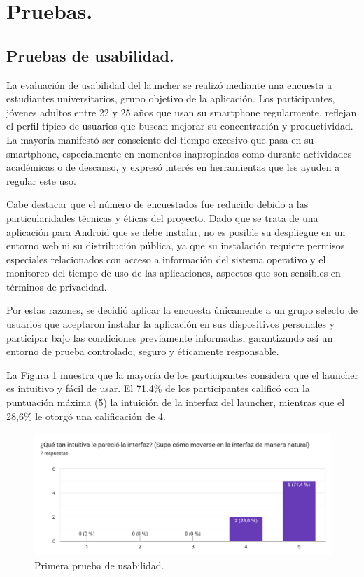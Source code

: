 \section{Pruebas.}
\label{sec:pruebas}

\subsection{Pruebas de usabilidad.}

La evaluación de usabilidad del launcher se realizó mediante una encuesta a estudiantes universitarios, grupo objetivo de la aplicación. Los participantes, jóvenes adultos entre 22 y 25 años que usan su smartphone regularmente, reflejan el perfil típico de usuarios que buscan mejorar su concentración y productividad. La mayoría manifestó ser consciente del tiempo excesivo que pasa en su smartphone, especialmente en momentos inapropiados como durante actividades académicas o de descanso, y expresó interés en herramientas que les ayuden a regular este uso.

Cabe destacar que el número de encuestados fue reducido debido a las particularidades técnicas y éticas del proyecto. Dado que se trata de una aplicación para Android que se debe instalar, no es posible su despliegue en un entorno web ni su distribución pública, ya que su instalación requiere permisos especiales relacionados con acceso a información del sistema operativo y el monitoreo del tiempo de uso de las aplicaciones, aspectos que son sensibles en términos de privacidad.

Por estas razones, se decidió aplicar la encuesta únicamente a un grupo selecto de usuarios que aceptaron instalar la aplicación en sus dispositivos personales y participar bajo las condiciones previamente informadas, garantizando así un entorno de prueba controlado, seguro y éticamente responsable.

La Figura \ref{fig:interfaz_intuitiva} muestra que la mayoría de los participantes considera que el launcher es intuitivo y fácil de usar. El 71,4\% de los participantes calificó con la puntuación máxima (5) la intuición de la interfaz del launcher, mientras que el 28,6\% le otorgó una calificación de 4.

\begin{figure}[h]
  \caption{Primera prueba de usabilidad.}
  \label{fig:interfaz_intuitiva}
  \includegraphics[width=\textwidth]{Figuras/interfaz_intuitiva.png}
  \centering
\end{figure}

